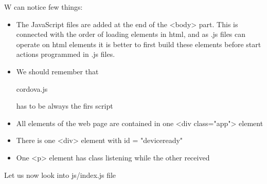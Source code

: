 W can notice few things:
\begin{explain}
\begin{itemize}
\item The JavaScript files are added at the end of the <body> part. This is connected with the order of loading elements in html, and as .js files can operate on html elements it is better to first build these elements before start actions programmed in .js files.

\item We should remember that \begin{warning}cordova.js\end{warning} has to be always the firs script

\item All elements of the web page are contained in one <div class="app"> element

\item There is one <div> element  with id = "deviceready"
\item One <p> element has class listening while the other received

\end{itemize}
\end{explain}

Let us now look into js/index.js file


